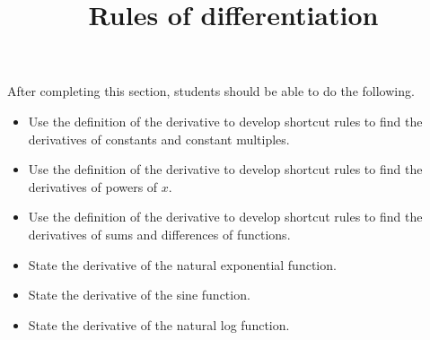 \documentclass{ximera}
\title{Rules of differentiation}
\begin{document}
\begin{abstract}
\end{abstract}

\maketitle

\begin{sectionOutcomes}

After completing this section, students should be able to do the following.

\begin{itemize}
	\item Use the definition of the derivative to develop shortcut rules to find the derivatives of constants and constant multiples.
	\item Use the definition of the derivative to develop shortcut rules to find the derivatives of powers of $x$.
	\item Use the definition of the derivative to develop shortcut rules to find the derivatives of sums and differences of functions.
	\item State the derivative of the natural exponential function.
	\item State the derivative of the sine function.
	\item State the derivative of the natural log function.
\end{itemize}

\end{sectionOutcomes}
\end{document}
